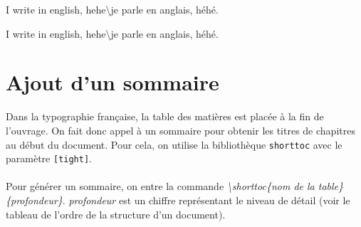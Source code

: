 \documentclass[a4paper, 10pt]{book}
\begin{document}
I write in english, hehe\textbackslash je parle en anglais, héhé.

I write in english, hehe\textbackslash je parle en anglais, héhé. \\ 
\section{Ajout d'un sommaire\\}	
Dans la typographie française, la table des matières est placée à la fin de l'ouvrage. On fait donc appel à un sommaire pour obtenir les titres de chapitres au début du document. Pour cela, on utilise la bibliothèque \texttt{shorttoc} avec le paramètre \texttt{[tight]}. \\\\
Pour générer un sommaire, on entre la commande \textit{\textbackslash shorttoc\{nom de la table\}\{profondeur\}}. \textit{profondeur} est un chiffre représentant le niveau de détail (voir le tableau de l'ordre de la structure d'un document).\\ \\


\backmatter




\tableofcontents
\end{document}
